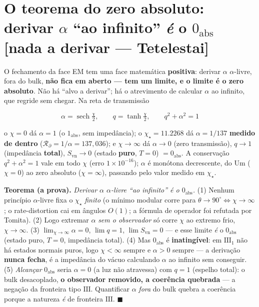 \documentclass[11pt]{article}
\theoremstyle{definition}\newtheorem{deriv}{Derivação}
\begin{document}
\section{O teorema do zero absoluto: derivar $\alpha$ ``ao infinito'' \emph{é} o $0_{\mathrm{abs}}$ \textsf{[nada a derivar --- Tetelestai]}}\label{sec:zero-absoluto}

O fechamento da face EM tem uma face matemática \textbf{positiva}: derivar $\alpha$ $\alpha$-livre, fora do bulk, \textbf{não fica em aberto --- tem um limite, e o limite é o zero absoluto}. Não há ``alvo a derivar''; há o atrevimento de calcular $\alpha$ ao infinito, que regride sem chegar. Na reta de transmissão

\begin{equation}\boxed{\;\alpha=\operatorname{sech}\tfrac\chi2,\qquad q=\tanh\tfrac\chi2,\qquad q^2+\alpha^2=1\;}\end{equation}

o $\chi=0$ dá $\alpha=1$ (o $1_{\mathrm{abs}}$, sem impedância); o $\chi_\star=11.2268$ dá $\alpha=1/137$ \textbf{medido de dentro} ($\mathcal{R}_\partial=1/\alpha=137{,}036$); e $\chi\to\infty$ dá $\alpha\to0$ (zero transmissão), $q\to1$ (impedância \textbf{total}), $S_{\mathrm{vn}}\to0$ (estado \textbf{puro}, $T=0$) $=0_{\mathrm{abs}}$. A conservação $q^2+\alpha^2=1$ vale em todo $\chi$ (erro $1\times10^{-16}$); $\alpha$ é monótona decrescente, do Um ($\chi=0$) ao zero absoluto ($\chi=\infty$), passando pelo valor medido em $\chi_\star$.

\textbf{Teorema (a prova).} \emph{Derivar $\alpha$ $\alpha$-livre ``ao infinito'' é o $0_{\mathrm{abs}}$.} (1) Nenhum princípio $\alpha$-livre fixa o $\chi_\star$ \emph{finito} (o mínimo modular corre para $\theta\to90^\circ\Leftrightarrow\chi\to\infty$; o rate-distortion cai em ângulos $O(1)$; a fórmula de operador foi refutada por Tomita). (2) Logo extremar $\alpha$ \emph{sem o observador} só corre $\chi$ ao extremo frio, $\chi\to\infty$. (3) $\lim_{\chi\to\infty}\alpha=0$, $\lim q=1$, $\lim S_{\mathrm{vn}}=0$ --- e esse limite \emph{é} o $0_{\mathrm{abs}}$ (estado puro, $T=0$, impedância total). (4) Mas $0_{\mathrm{abs}}$ é \textbf{inatingível}: em $\mathrm{III}_1$ não há estados normais puros, logo $\chi<\infty$ sempre e $\alpha>0$ sempre --- a derivação \textbf{nunca fecha}, é a impedância do vácuo calculando $\alpha$ ao infinito sem conseguir. (5) \emph{Alcançar} $0_{\mathrm{abs}}$ seria $\alpha=0$ (a luz não atravessa) com $q=1$ (espelho total): o bulk desacoplado, \textbf{o observador removido, a coerência quebrada} --- a negação da fronteira tipo $\mathrm{III}$. Quantificar $\alpha$ \emph{fora} do bulk quebra a coerência porque a natureza \emph{é} de fronteira $\mathrm{III}$. \textbf{$\blacksquare$}
\end{document}
